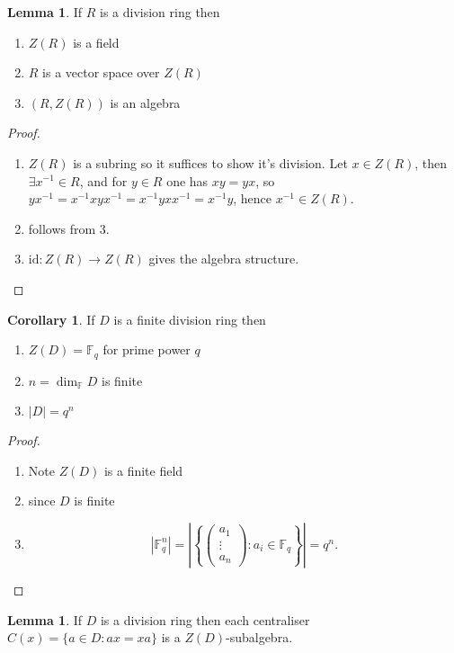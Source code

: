 \documentclass[a4paper]{article}
\newcommand{\F}{\mathbb{F}}
\newcommand{\id}{\text{id}}
\theoremstyle{definition}
\newtheorem{lemma}[defn]{Lemma}
\newtheorem{coro}[defn]{Corollary}
\begin{document}
\begin{lemma}
If $R$ is a division ring then
\begin{enumerate}
\item $Z(R)$ is a field
\item $R$ is a vector space over $Z(R)$
\item $(R,Z(R))$ is an algebra
\end{enumerate}
\end{lemma}
\begin{proof}
\begin{enumerate}
\item $Z(R)$ is a subring so it suffices to show it's division. Let $x\in Z(R)$, then $\exists x^{-1}\in R$, and for $y\in R$ one has $xy=yx$, so $yx^{-1}=x^{-1}xyx^{-1}=x^{-1}yxx^{-1}=x^{-1}y$, hence $x^{-1}\in Z(R)$.
\item follows from 3.
\item $\id:Z(R)\rightarrow Z(R)$ gives the algebra structure.
\end{enumerate}
\end{proof}

\begin{coro}
\label{coro:findivring}
If $D$ is a finite division ring then
\begin{enumerate}
\item $Z(D)=\F_q$ for prime power $q$
\item $n=\dim_\F D$ is finite
\item $|D|=q^n$
\end{enumerate}
\end{coro}
\begin{proof}
\begin{enumerate}
\item Note $Z(D)$ is a finite field
\item since $D$ is finite
\item \[
|\F_q^n|=\left| \left\{ \begin{pmatrix}a_1\\ \vdots\\a_n\end{pmatrix}:a_i\in\F_q \right\} \right|=q^n.
\]
\end{enumerate}
\end{proof}

\begin{lemma}
\label{lemma:CxofdivringisZDsubalgebra}
If $D$ is a division ring then each centraliser $C(x)=\{a\in D:ax=xa\}$ is a $Z(D)$-subalgebra.
\end{lemma}
\end{document}
